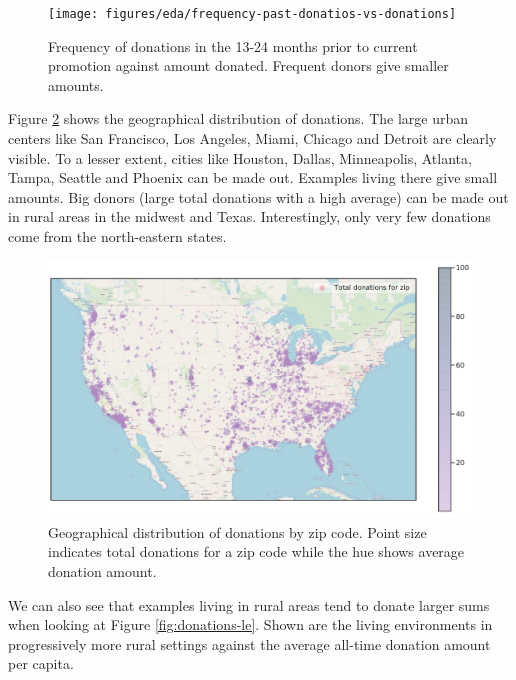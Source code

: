 \documentclass[
  11pt,
  a4paper,
  DIV=12,captions=tableheading,oneside,titlepage]{scrbook}
\begin{document}
\begin{figure}

{\centering \texttt{[image: figures/eda/frequency-past-donatios-vs-donations]} 

}

\caption{Frequency of donations in the 13-24 months prior to current promotion against amount donated. Frequent donors give smaller amounts.}\label{fig:rfa-f}
\end{figure}

Figure \ref{fig:donations-geo} shows the geographical distribution of donations. The large urban centers like San Francisco, Los Angeles, Miami, Chicago and Detroit are clearly visible. To a lesser extent, cities like Houston, Dallas, Minneapolis, Atlanta, Tampa, Seattle and Phoenix can be made out. Examples living there give small amounts. Big donors (large total donations with a high average) can be made out in rural areas in the midwest and Texas. Interestingly, only very few donations come from the north-eastern states.



\begin{figure}

{\centering \includegraphics[width=1\linewidth]{figures/eda/donations-geographical} 

}

\caption{Geographical distribution of donations by zip code. Point size indicates total donations for a zip code while the hue shows average donation amount.}\label{fig:donations-geo}
\end{figure}

We can also see that examples living in rural areas tend to donate larger sums when looking at Figure \ref{fig:donations-le}. Shown are the living environments in progressively more rural settings against the average all-time donation amount per capita.
\end{document}
